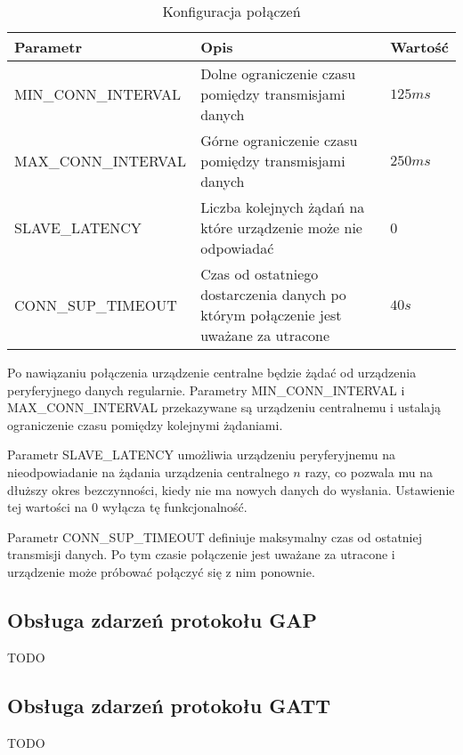 \begin{table}[t]

\begin{tabularx}{\linewidth}{|l|X|l|}

\hline Parametr & Opis & Wartość \\

\hline MIN\_CONN\_INTERVAL & Dolne ograniczenie czasu pomiędzy transmisjami
danych & $125ms$ \\

\hline MAX\_CONN\_INTERVAL & Górne ograniczenie czasu pomiędzy transmisjami
danych & $250ms$ \\

\hline SLAVE\_LATENCY & Liczba kolejnych żądań na które urządzenie może nie
odpowiadać & 0 \\

\hline CONN\_SUP\_TIMEOUT & Czas od ostatniego dostarczenia danych po którym
połączenie jest uważane za utracone & $40s$ \\

\hline \end{tabularx}

\caption{Konfiguracja połączeń}

\label{tab:parametry-polaczenia}

\end{table}

Po nawiązaniu połączenia urządzenie centralne będzie żądać od urządzenia
peryferyjnego danych regularnie. Parametry MIN\_CONN\_INTERVAL
i MAX\_CONN\_INTERVAL przekazywane są urządzeniu centralnemu i ustalają
ograniczenie czasu pomiędzy kolejnymi żądaniami.

Parametr SLAVE\_LATENCY umożliwia urządzeniu peryferyjnemu na nieodpowiadanie na
żądania urządzenia centralnego $n$ razy, co pozwala mu na dłuższy okres
bezczynności, kiedy nie ma nowych danych do wysłania. Ustawienie tej wartości na
0 wyłącza tę funkcjonalność.

Parametr CONN\_SUP\_TIMEOUT definiuje maksymalny czas od ostatniej transmisji
danych. Po tym czasie połączenie jest uważane za utracone i urządzenie może
próbować połączyć się z nim ponownie.

\subsection{Obsługa zdarzeń protokołu GAP}

TODO

\subsection{Obsługa zdarzeń protokołu GATT}

TODO
